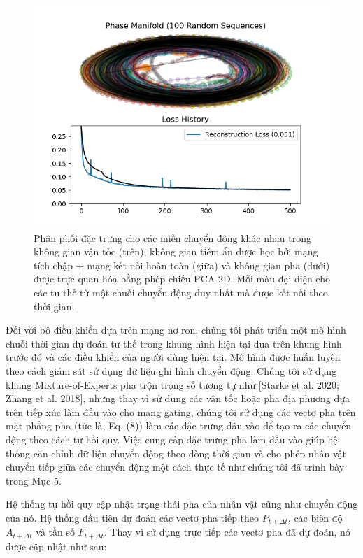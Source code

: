 \begin{figure}
	\centering
	\includegraphics[]{images/PhaseManifold.png}
	\caption{Phân phối đặc trưng cho các miền chuyển động khác nhau trong không gian vận tốc (trên), không gian tiềm ẩn được học bởi mạng tích chập + mạng kết nối hoàn toàn (giữa) và không gian pha (dưới) được trực quan hóa bằng phép chiếu PCA 2D. Mỗi màu đại diện cho các tư thế từ một chuỗi chuyển động duy nhất mà được kết nối theo thời gian.}
	\label{fig:PhaseManifold}
\end{figure}


Đối với bộ điều khiển dựa trên mạng nơ-ron, chúng tôi phát triển một mô hình chuỗi thời gian dự đoán tư thế trong khung hình hiện tại dựa trên khung hình trước đó và các điều khiển của người dùng hiện tại. Mô hình được huấn luyện theo cách giám sát sử dụng dữ liệu ghi hình chuyển động. Chúng tôi sử dụng khung Mixture-of-Experts pha trộn trọng số tương tự như [Starke et al. 2020; Zhang et al. 2018], nhưng thay vì sử dụng các vận tốc hoặc pha địa phương dựa trên tiếp xúc làm đầu vào cho mạng gating, chúng tôi sử dụng các vectơ pha trên mặt phẳng pha (tức là, Eq. (8)) làm các đặc trưng đầu vào để tạo ra các chuyển động theo cách tự hồi quy. Việc cung cấp đặc trưng pha làm đầu vào giúp hệ thống căn chỉnh dữ liệu chuyển động theo dòng thời gian và cho phép nhân vật chuyển tiếp giữa các chuyển động một cách thực tế như chúng tôi đã trình bày trong Mục 5.

Hệ thống tự hồi quy cập nhật trạng thái pha của nhân vật cũng như chuyển động của nó. Hệ thống đầu tiên dự đoán các vectơ pha tiếp theo $P_{t+\Delta t}$, các biên độ $A_{t+\Delta t}$ và tần số $F_{t+\Delta t}$. Thay vì sử dụng trực tiếp các vectơ pha đã dự đoán, nó được cập nhật như sau:

